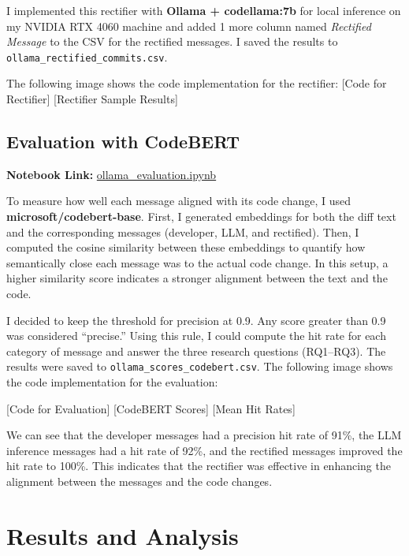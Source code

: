 \documentclass[10pt,a4paper]{report}
\begin{document}
I implemented this rectifier with \textbf{Ollama + codellama:7b} for local inference on my NVIDIA RTX 4060 machine and added 1 more column named \textit{Rectified Message} to the CSV for the rectified messages. I saved the results to \texttt{ollama\_rectified\_commits.csv}.

The following image shows the code implementation for the rectifier:
[Code for Rectifier]
[Rectifier Sample Results]



\subsection{Evaluation with CodeBERT}
\textbf{Notebook Link:} \href{https://github.com/ShardulJunagade/cs202-stt/lab2/ollama_evaluation.ipynb}{ollama\_evaluation.ipynb}

To measure how well each message aligned with its code change, I used \textbf{microsoft/codebert-base}. First, I generated embeddings for both the diff text and the corresponding messages (developer, LLM, and rectified). Then, I computed the cosine similarity between these embeddings to quantify how semantically close each message was to the actual code change. In this setup, a higher similarity score indicates a stronger alignment between the text and the code.

I decided to keep the threshold for precision at 0.9. Any score greater than 0.9 was considered “precise.” Using this rule, I could compute the hit rate for each category of message and answer the three research questions (RQ1–RQ3). The results were saved to \texttt{ollama\_scores\_codebert.csv}. The following image shows the code implementation for the evaluation:

[Code for Evaluation]
[CodeBERT Scores]
[Mean Hit Rates]

We can see that the developer messages had a precision hit rate of 91\%, the LLM inference messages had a hit rate of 92\%, and the rectified messages improved the hit rate to 100\%. This indicates that the rectifier was effective in enhancing the alignment between the messages and the code changes.

\section{Results and Analysis}
\end{document}
